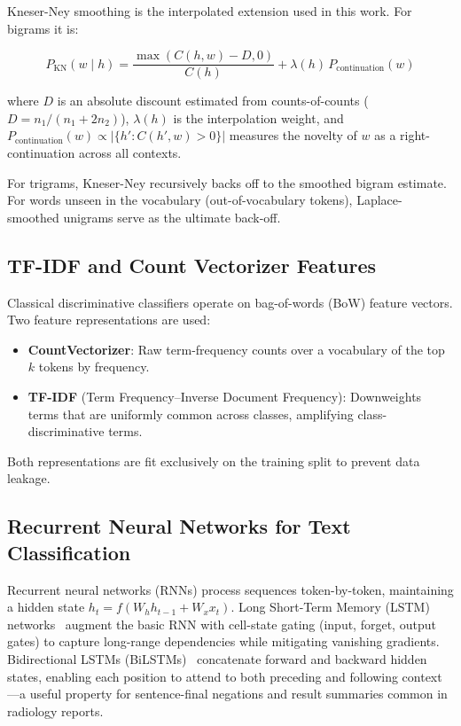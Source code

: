 \documentclass[11pt,a4paper]{article}
\begin{document}
Kneser-Ney smoothing \cite{kneser1995improved} is the interpolated extension
used in this work.
For bigrams it is:

\begin{equation}
  P_{\text{KN}}(w \mid h) =
    \frac{\max(C(h,w) - D, 0)}{C(h)}
    + \lambda(h)\,P_{\text{continuation}}(w)
\end{equation}

where $D$ is an absolute discount estimated from counts-of-counts
($D = n_1 / (n_1 + 2n_2)$), $\lambda(h)$ is the interpolation weight,
and $P_{\text{continuation}}(w) \propto |\{h' : C(h',w) > 0\}|$ measures the
novelty of $w$ as a right-continuation across all contexts.

For trigrams, Kneser-Ney recursively backs off to the smoothed bigram estimate.
For words unseen in the vocabulary (out-of-vocabulary tokens), Laplace-smoothed
unigrams serve as the ultimate back-off.

\subsection{TF-IDF and Count Vectorizer Features}

Classical discriminative classifiers operate on bag-of-words (BoW) feature
vectors.
Two feature representations are used:
\begin{itemize}
  \item \textbf{CountVectorizer}: Raw term-frequency counts over a
        vocabulary of the top $k$ tokens by frequency.
  \item \textbf{TF-IDF} (Term Frequency--Inverse Document Frequency):
        Downweights terms that are uniformly common across classes,
        amplifying class-discriminative terms.
\end{itemize}

Both representations are fit exclusively on the training split to prevent
data leakage.

\subsection{Recurrent Neural Networks for Text Classification}

Recurrent neural networks (RNNs) process sequences token-by-token, maintaining
a hidden state $h_t = f(W_h h_{t-1} + W_x x_t)$.
Long Short-Term Memory (LSTM) networks~\cite{hochreiter1997long} augment the
basic RNN with cell-state gating (input, forget, output gates) to capture
long-range dependencies while mitigating vanishing gradients.
Bidirectional LSTMs (BiLSTMs)~\cite{schuster1997bidirectional} concatenate
forward and backward hidden states, enabling each position to attend to both
preceding and following context---a useful property for sentence-final negations
and result summaries common in radiology reports.
\end{document}
